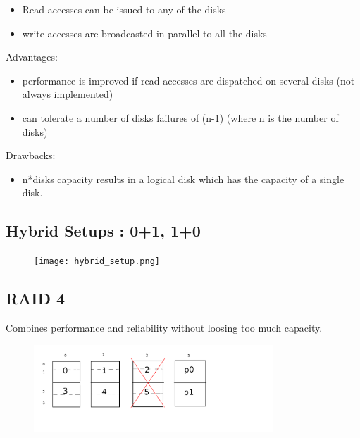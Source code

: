 \documentclass[a4paper,10pt]{report}
\begin{document}
\begin{itemize}
  \item Read accesses can be issued to any of the disks
  \item write accesses are broadcasted in parallel to all the disks
\end{itemize}

Advantages:

\begin{itemize}
  \item performance is improved if read accesses are dispatched on several disks (not always implemented)
  \item can tolerate a number of disks failures of (n-1) (where n is the number of disks)
\end{itemize}

Drawbacks:

\begin{itemize}
  \item n*disks capacity results in a logical disk which has the capacity of a single disk. 
\end{itemize}

\subsection{Hybrid Setups : 0+1, 1+0}

\begin{figure}[h!]
  \begin{center}
    \texttt{[image: hybrid\_setup.png]}
    \caption{}
  \end{center}
\end{figure}

\subsection{RAID 4}

Combines performance and reliability without loosing too much capacity.

\begin{figure}[h!]
  \begin{center}
    \includegraphics[width=0.8\textwidth]{raid_4.png}
    \caption{}
  \end{center}
\end{figure}
\end{document}
